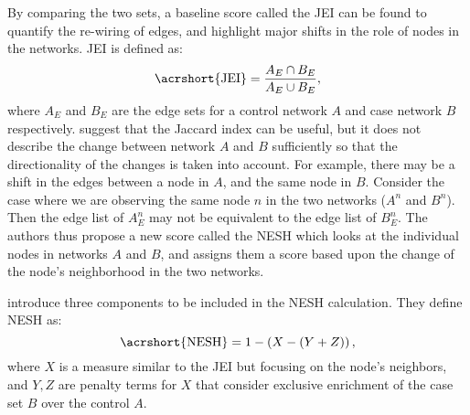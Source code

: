 By comparing the two sets, a baseline score called the \acrfull{JEI} can be found to quantify the re-wiring of edges, and highlight major shifts in the role of nodes in the networks. \acrshort{JEI} is defined as:
\begin{equation}\label{eq:JEI}
    \text{\acrshort{JEI}} = \frac{A_E \cap B_E}{A_E \cup B_E},
\end{equation}
where $A_E$ and $B_E$ are the edge sets for a control network $A$ and case network $B$ respectively. \citeauthor{Kuntal2018} suggest that the Jaccard index can be useful, but it does not describe the change between network $A$ and $B$ sufficiently so that the directionality of the changes is taken into account. For example, there may be a shift in the edges between a node in $A$, and the same node in $B$. Consider the case where we are observing the same node $n$ in the two networks ($A^n$ and $B^n$). Then the edge list of $A^n_E$ may not be equivalent to the edge list of $B^n_E$. The authors thus propose a new score called the \acrfull{NESH} which looks at the individual nodes in networks $A$ and $B$, and assigns them a score based upon the change of the node's neighborhood in the two networks.

\citeauthor{Kuntal2018} introduce three components to be included in the \acrshort{NESH} calculation. They define \acrshort{NESH} as:
\begin{equation}\label{eq:NESH}
    \text{\acrshort{NESH}} = 1 - \left(X - \left(Y +Z\right) \right),
\end{equation}
where $X$ is a measure similar to the \acrshort{JEI} but focusing on the node's neighbors, and $Y,Z$ are penalty terms for $X$ that consider exclusive enrichment of the case set $B$ over the control $A$.

